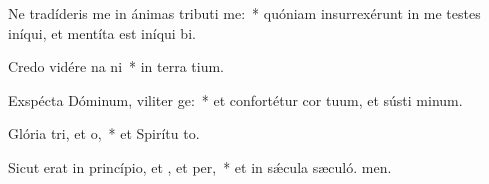 \item Ne tradíderis me in ánimas tributi me:~* quóniam insurrexérunt in me testes iníqui, et mentíta est iníqui bi.
\item Credo vidére na ni~* in terra tium.
\item Exspécta Dóminum, viliter ge:~* et confortétur cor tuum, et sústi minum.
\item Glória tri, et o,~* et Spirítu to.
\item Sicut erat in princípio, et , et per,~* et in sǽcula sæculó. men.
